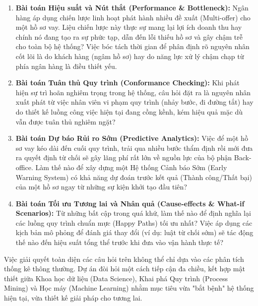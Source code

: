 \documentclass[a4paper,12pt]{article}
\begin{document}
\begin{enumerate}
    \item \textbf{Bài toán Hiệu suất và Nút thắt (Performance \& Bottleneck):} Ngân hàng áp dụng chiến lược linh hoạt phát hành nhiều đề xuất (Multi-offer) cho một hồ sơ vay. Liệu chiến lược này thực sự mang lại lợi ích doanh thu hay chính nó đang tạo ra sự phức tạp, dẫn đến lỗi thiếu hồ sơ và gây chậm trễ cho toàn bộ hệ thống? Việc bóc tách thời gian để phân định rõ nguyên nhân cốt lõi là do khách hàng (ngâm hồ sơ) hay do năng lực xử lý chậm chạp từ phía ngân hàng là điều thiết yếu.
    \item \textbf{Bài toán Tuân thủ Quy trình (Conformance Checking):} Khi phát hiện sự trì hoãn nghiêm trọng trong hệ thống, câu hỏi đặt ra là nguyên nhân xuất phát từ việc nhân viên vi phạm quy trình (nhảy bước, đi đường tắt) hay do thiết kế luồng công việc hiện tại đang cồng kềnh, kém hiệu quả mặc dù vẫn được tuân thủ nghiêm ngặt?
    \item \textbf{Bài toán Dự báo Rủi ro Sớm (Predictive Analytics):} Việc để một hồ sơ vay kéo dài đến cuối quy trình, trải qua nhiều bước thẩm định rồi mới đưa ra quyết định từ chối sẽ gây lãng phí rất lớn về nguồn lực của bộ phận Back-office. Làm thế nào để xây dựng một Hệ thống Cảnh báo Sớm (Early Warning System) có khả năng dự đoán trước kết quả (Thành công/Thất bại) của một hồ sơ ngay từ những sự kiện khởi tạo đầu tiên?
    \item \textbf{Bài toán Tối ưu Tương lai và Nhân quả (Cause-effects \& What-if Scenarios):} Từ những bất cập trong quá khứ, làm thế nào để định nghĩa lại các luồng quy trình chuẩn mực (Happy Paths) tối ưu nhất? Việc áp dụng các kịch bản mô phỏng để đánh giá thay đổi (ví dụ: luật từ chối sớm) sẽ tác động thế nào đến hiệu suất tổng thể trước khi đưa vào vận hành thực tế?
\end{enumerate}

Việc giải quyết toàn diện các câu hỏi trên không thể chỉ dựa vào các phân tích thống kê thông thường. Dự án đòi hỏi một cách tiếp cận đa chiều, kết hợp mật thiết giữa Khoa học dữ liệu (Data Science), Khai phá Quy trình (Process Mining) và Học máy (Machine Learning) nhằm mục tiêu vừa "bắt bệnh" hệ thống hiện tại, vừa thiết kế giải pháp cho tương lai.
\end{document}
